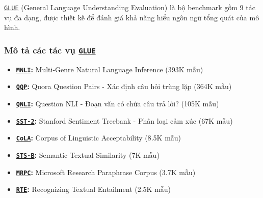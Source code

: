     \hyperref[acro:glue]{\texttt{GLUE}} (General Language Understanding Evaluation) \cite{wang2018glue} là bộ benchmark gồm 9 tác vụ đa dạng, được thiết kế để đánh giá khả năng hiểu ngôn ngữ tổng quát của mô hình.
    
    \subsubsection{Mô tả các tác vụ \hyperref[acro:glue]{\texttt{GLUE}}}
    \begin{itemize}
        \item \textbf{\hyperref[acro:mnli]{\texttt{MNLI}}:} Multi-Genre Natural Language Inference (393K mẫu)
        \item \textbf{\hyperref[acro:qqp]{\texttt{QQP}}:} Quora Question Pairs - Xác định câu hỏi trùng lặp (364K mẫu)
        \item \textbf{\hyperref[acro:qnli]{\texttt{QNLI}}:} Question NLI - Đoạn văn có chứa câu trả lời? (105K mẫu)
        \item \textbf{\hyperref[acro:sst2]{\texttt{SST-2}}:} Stanford Sentiment Treebank - Phân loại cảm xúc (67K mẫu)
        \item \textbf{\hyperref[acro:cola]{\texttt{CoLA}}:} Corpus of Linguistic Acceptability (8.5K mẫu)
        \item \textbf{\hyperref[acro:stsb]{\texttt{STS-B}}:} Semantic Textual Similarity (7K mẫu)
        \item \textbf{\hyperref[acro:mrpc]{\texttt{MRPC}}:} Microsoft Research Paraphrase Corpus (3.7K mẫu)
        \item \textbf{\hyperref[acro:rte]{\texttt{RTE}}:} Recognizing Textual Entailment (2.5K mẫu)
    \end{itemize}
    

